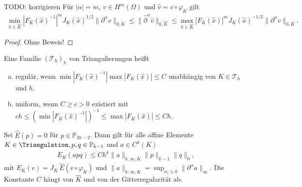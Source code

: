 \begin{Satz}[Transformationsformel] TODO: korrigieren
    \label{satz:4.11}
    Für $|\alpha| =m$, $v\in H^m(\Omega)$ und 
    $\hat v = v \circ \varphi_K$ gilt
        \begin{eqnarray*}
                \min_{\hat x\in\hat K} |F_K(\hat x)^{-1}|^m J_K(\hat x)^{1/2}
                \|\partial^\alpha v\|_{0,K}
            \le \|\hat \partial^\alpha \hat v\|_{0,\hat K}
            \le \max_{\hat x\in\hat K} |F_K(\hat x)|^m J_K(\hat x)^{-1/2}
                \|\partial^\alpha v\|_{0,K}.
        \end{eqnarray*}
\end{Satz}


\begin{proof}
    Ohne Beweis!
\end{proof}


\begin{Definition}
    \label{def:4.12}
    Eine Familie $(\mathcal T_h)_h$ von Triangulierungen heißt 
    \begin{enumerate}[a)]
      \item
        regulär, wenn $\min |F_K(\hat x)^{-1}| \max |F_K(\hat x)|\leq C$
        unabhängig von $K\in \mathcal T_h$ und $h$.
      \item 
        uniform, wenn $C\geq c>0$ existiert mit
        $ch\leq (\min |F_K(\hat x)^{-1}|)^{-1}\leq \max |F_K(\hat x)|\leq Ch$.
    \end{enumerate}
\end{Definition}


\begin{Lemma}
    \label{lem:4.13}
    Sei $\hat E(p) = 0$ für $p\in \mathbb P_{2k-2}$. Dann gilt für alle affine
    Elemente $K\in \Triangulation, p,q\in \mathbb P_{k-1}$ und $a\in C^k(K)$
    \begin{eqnarray*}
        E_K(apq) \le C h^k \|a\|_{k,\infty,K}
        \| p \|_{k-1} \| q \|_{0},
    \end{eqnarray*}
    mit $E_K(v) = J_K \, \hat E (v \circ \varphi_K)$ und
    $\|a\|_{k,\infty,K} = \sup_{\alpha_i \le k} \|\partial^\alpha a\|_\infty$.
    Die Konstante $C$ hängt von $\hat K$ und von der Gitterregularität ab.
\end{Lemma}


